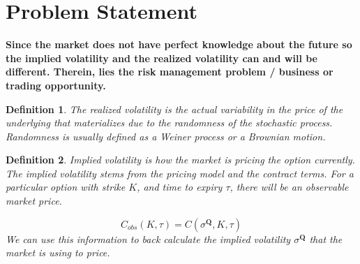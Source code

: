 \documentclass{article}[16pt]
\newtheorem{definition}{Definition}
\begin{document}
\onehalfspacing


\tableofcontents

\newpage
\section{Problem Statement}

\textbf{Since the market does not have perfect knowledge about the future so the implied volatility and the realized volatility can and will be different. Therein, lies the risk management problem / business or trading opportunity.}

\begin{definition}
    The realized volatility is the actual variability in the price of the underlying that materializes due to the randomness of the stochastic process.  Randomness is usually defined as a Weiner process or a Brownian motion.
\end{definition}

\begin{definition}
    Implied volatility is how the market is pricing the option currently. The implied volatility stems from the pricing model and the contract terms. For a particular option with strike $ K$, and time to expiry $ \tau$, there will be an observable market price.

    $$ C_{obs}(K, \tau) = C(\sigma^{\mathbf{Q}}, K, \tau)$$
    We can use this information to back calculate the implied volatility $ \sigma^{\mathbf{Q}}$ that the market is using to price.
\end{definition}
\end{document}
